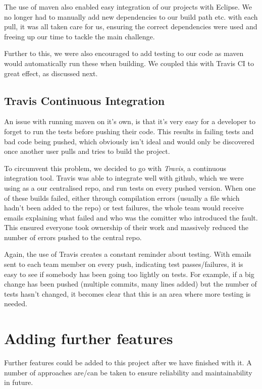 \documentclass[a4paper]{article}
\begin{document}
The use of maven also enabled easy integration of our projects with Eclipse. We
no longer had to manually add new dependencies to our build path etc. with each
pull, it was all taken care for us, ensuring the correct dependencies were used
and freeing up our time to tackle the main challenge.

Further to this, we were also encouraged to add testing to our code as maven would
automatically run these when building. We coupled this with Travis CI to great effect,
as discussed next.

\subsection{Travis Continuous Integration}

An issue with running maven on it's own, is that it's very easy for a developer
to forget to run the tests before pushing their code. This results in failing tests 
and bad code being pushed, which obviously isn't ideal and would only be discovered
once another user pulls and tries to build the project.

To circumvent this problem, we decided to go with \emph{Travis}, a continuous
integration tool. Travis was able to integrate well with github, which we were
using as a our centralised repo, and run tests on every pushed version. When one
of these builds failed, either through compilation errors (usually a file which
hadn't been added to the repo) or test failures, the whole team would receive
emails explaining what failed and who was the comitter who introduced the fault.
This ensured everyone took ownership of their work and massively reduced the 
number of errors pushed to the central repo.

Again, the use of Travis creates a constant reminder about testing. With emails
sent to each team member on every push, indicating test passes/failures, it is
easy to see if somebody has been going too lightly on tests. For example, if
a big change has been pushed (multiple commits, many lines added) but the number
of tests hasn't changed, it becomes clear that this is an area where more testing
is needed.

\section{Adding further features}

Further features could be added to this project after we have finished with it.
A number of approaches are/can be taken to ensure reliability and maintainability
in future.
\end{document}
